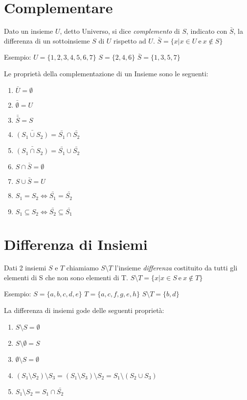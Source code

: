 \section{Complementare}
Dato un insieme $U$, detto Universo, si dice \textit{complemento} di $S$, indicato con $\bar{S}$,
la differenza di un sottoinsieme $S$ di $U$ rispetto ad $U$.\newline
$\bar{S} = \{x | x \in U \ \text{e} \ x \not \in S \} $

Esempio: \newline
$U = \{1,2,3,4,5,6,7\} $\newline
$S = \{2,4,6\} $ \newline
$\bar{S} = \{1,3,5,7\} $

Le proprietà della complementazione di un Insieme sono le seguenti:
\begin{prop}
\begin{enumerate}
  \item $\bar{U} = \emptyset $
  \item $\bar{\emptyset} = U$
  \item $\bar{\bar{S}} = S$
  \item $\bar{(S_1 \cup S_2)} = \bar{S_1} \cap \bar{S_2}$
  \item $\bar{(S_1 \cap S_2)} = \bar{S_1} \cup \bar{S_2}$
  \item $S \cap \bar{S} = \emptyset$
  \item $S \cup \bar{S} = U$
  \item $S_1 = S_2 \iff \bar{S_1} = \bar{S_2}$
  \item $S_1 \subseteq S_2 \iff \bar{S_2} \subseteq \bar{S_1}$
\end{enumerate}
\end{prop}

\section{Differenza di Insiemi}
Dati 2 insiemi $S$ e $T$ chiamiamo $S \setminus T$ l'insieme \textit{differenza} costituito
da tutti gli elementi di S che non sono elementi di T. \newline
$S \setminus T = \{x | x \in S \ \text{e} \ x \not \in T\} $

Esempio: \newline
$S = \{a,b,c,d,e\}$ \quad $T = \{a,c,f,g,e,h\}$\newline
$S \setminus T = \{b,d\}$

La differenza di insiemi gode delle seguenti proprietà:
\begin{prop}
\begin{enumerate}
  \item $S \setminus S = \emptyset$
  \item $S \setminus \emptyset = S$
  \item $\emptyset \setminus S = \emptyset$
  \item $(S_1 \setminus S_2) \setminus S_3 =
         (S_1 \setminus S_3) \setminus S_2 = S_1 \setminus (S_2 \cup S_3)$
  \item $S_1 \setminus S_2 = S_1 \cap \bar{S_2}$
\end{enumerate}
\end{prop}

